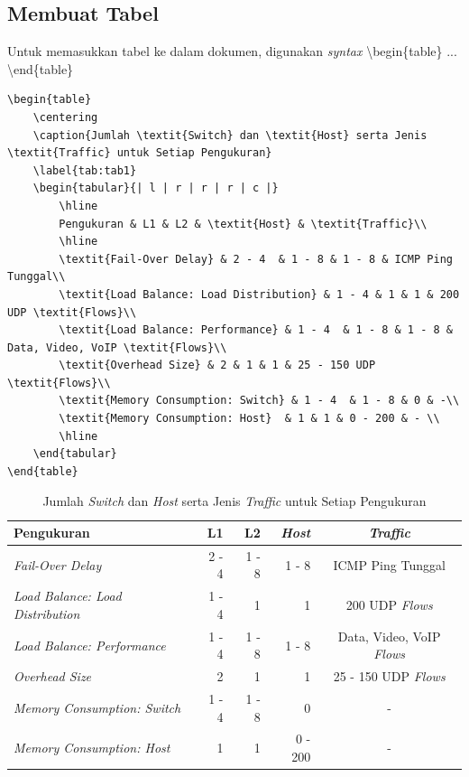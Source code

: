 \subsection{Membuat Tabel}
Untuk memasukkan tabel ke dalam dokumen, digunakan \textit{syntax} \textbackslash begin\{table\} ... \textbackslash end\{table\}

\begin{lstlisting}
\begin{table}
	\centering
	\caption{Jumlah \textit{Switch} dan \textit{Host} serta Jenis \textit{Traffic} untuk Setiap Pengukuran}
	\label{tab:tab1}
	\begin{tabular}{| l | r | r | r | c |}
		\hline
		Pengukuran & L1 & L2 & \textit{Host} & \textit{Traffic}\\ 
		\hline
		\textit{Fail-Over Delay} & 2 - 4  & 1 - 8 & 1 - 8 & ICMP Ping Tunggal\\
		\textit{Load Balance: Load Distribution} & 1 - 4 & 1 & 1 & 200 UDP \textit{Flows}\\
		\textit{Load Balance: Performance} & 1 - 4  & 1 - 8 & 1 - 8 & Data, Video, VoIP \textit{Flows}\\
		\textit{Overhead Size} & 2 & 1 & 1 & 25 - 150 UDP \textit{Flows}\\
		\textit{Memory Consumption: Switch} & 1 - 4  & 1 - 8 & 0 & -\\
		\textit{Memory Consumption: Host}  & 1 & 1 & 0 - 200 & - \\
		\hline
	\end{tabular}
\end{table}
\end{lstlisting}

\begin{table}
	\centering
	\caption{Jumlah \textit{Switch} dan \textit{Host} serta Jenis \textit{Traffic} untuk Setiap Pengukuran}
	\label{tab:tab1}
	\begin{tabular}{| l | r | r | r | c |}
		\hline
		Pengukuran & L1 & L2 & \textit{Host} & \textit{Traffic}\\ 
		\hline
		\textit{Fail-Over Delay} & 2 - 4  & 1 - 8 & 1 - 8 & ICMP Ping Tunggal\\
		\textit{Load Balance: Load Distribution} & 1 - 4 & 1 & 1 & 200 UDP \textit{Flows}\\
		\textit{Load Balance: Performance} & 1 - 4  & 1 - 8 & 1 - 8 & Data, Video, VoIP \textit{Flows}\\
		\textit{Overhead Size} & 2 & 1 & 1 & 25 - 150 UDP \textit{Flows}\\
		\textit{Memory Consumption: Switch} & 1 - 4  & 1 - 8 & 0 & -\\
		\textit{Memory Consumption: Host}  & 1 & 1 & 0 - 200 & - \\
		\hline
	\end{tabular}
\end{table}

